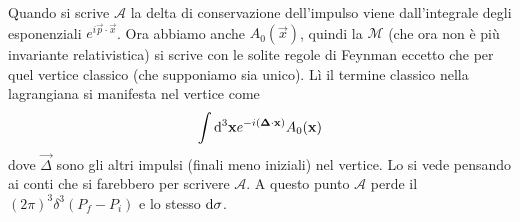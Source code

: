 \documentclass[12pt,a4paper]{article}
\begin{document}
	Quando si scrive $\mathcal{A}$ la delta di conservazione dell'impulso viene dall'integrale degli esponenziali $e^{i\vec{p}\cdot\vec{x}}$. Ora abbiamo anche $A_0(\vec{x})$, quindi la $\mathcal{M}$ (che ora non è più invariante relativistica) si scrive con le solite regole di Feynman eccetto che per quel vertice classico (che supponiamo sia unico). Lì il termine classico nella lagrangiana si manifesta nel vertice come
	\[ \int \mathrm{d}^3\mathbf{x} e^{-i(\mathbf{\Delta}\cdot\mathbf{x})} A_0(\mathbf{x}) \]
	dove $\vec{\Delta}$ sono gli altri impulsi (finali meno iniziali) nel vertice. Lo si vede pensando ai conti che si farebbero per scrivere $\mathcal{A}$. A questo punto $\mathcal{A}$ perde il $(2\pi)^3 \delta^3(P_f-P_i)$ e lo stesso $\mathrm{d} \sigma$.
	
\end{document}
